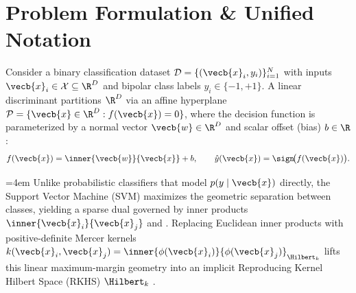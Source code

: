 \documentclass[../../../../master.tex]{subfiles}
\begin{document}

\section{Problem Formulation \& Unified Notation}

Consider a binary classification dataset $\mathcal{D} = \{(\vecb{x}_i, y_i)\}_{i=1}^N$ with inputs $\vecb{x}_i \in \mathcal{X} \subseteq \R^D$ and bipolar class labels $y_i \in \{-1, +1\}$. A linear discriminant partitions $\R^D$ via an affine hyperplane $\mathcal{P} = \{\vecb{x} \in \R^D : f(\vecb{x}) = 0\}$, where the decision function is parameterized by a normal vector $\vecb{w} \in \R^D$ and scalar offset (bias) $b \in \R$:
\begin{equation}
  f(\vecb{x}) = \inner{\vecb{w}}{\vecb{x}} + b, \qquad \hat{y}(\vecb{x}) = \sign\!\big(f(\vecb{x})\big).
  \label{eq:svm:linear_discriminant}
\end{equation}
{\sloppy\emergencystretch=4em
Unlike probabilistic classifiers that model $p(y \mid \vecb{x})$ directly, the Support Vector Machine (SVM) maximizes the geometric separation between classes, yielding a sparse dual governed by inner products $\inner{\vecb{x}_i}{\vecb{x}_j}$  and . Replacing Euclidean inner products with positive-definite Mercer kernels $k(\vecb{x}_i, \vecb{x}_j) = \inner{\phi(\vecb{x}_i)}{\phi(\vecb{x}_j)}_{\Hilbert_k}$ lifts this linear maximum-margin geometry into an implicit Reproducing Kernel Hilbert Space (RKHS) $\Hilbert_k$ .\par}
\end{document}
